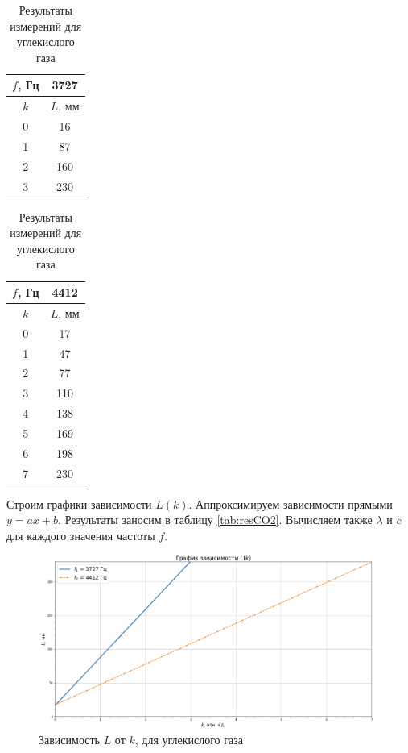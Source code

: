 \documentclass[a4paper,12pt]{article}
\theoremstyle{definition}
\begin{document}
	\begin{table}[!htb]
		
		\begin{minipage}{.5\linewidth}
			\centering
			\begin{tabular}{|c|c|}
				\hline
				$ f $, Гц & 3727  \\ \hline
				$ k $ & $  L $, мм   \\ \hline
				0 & 16 \\ \hline
				1 & 87 \\ \hline
				2 & 160 \\ \hline
				3 & 230 \\ \hline
			\end{tabular}
		\end{minipage}%
		\begin{minipage}{.5\linewidth}
			\centering
			\begin{tabular}{|c|c|}
				\hline
				$ f $, Гц & 4412  \\ \hline
				$ k $ & $  L $, мм   \\ \hline
				0 & 17 \\ \hline
				1 & 47 \\ \hline
				2 & 77 \\ \hline
				3 & 110 \\ \hline
				4 & 138 \\ \hline
				5 & 169 \\ \hline
				6 & 198 \\ \hline
				7 & 230 \\ \hline
			\end{tabular}
		\end{minipage}
		\caption{Результаты измерений для углекислого газа}
		\label{tab:CO2}
	\end{table}
	
	Строим графики зависимости $ L(k) $. Аппроксимируем зависимости прямыми $ y=ax+b $. Результаты заносим в таблицу \ref{tab:resCO2}. Вычисляем также $ \lambda $ и $ c $ для каждого значения частоты $ f $.
	
	\begin{figure}[h!]
		\centering
		\includegraphics[scale=0.542]{graph3}
		\caption{Зависимость $ L $ от $ k $, для углекислого газа}
		\label{graph2}
	\end{figure}
	
\end{document}
